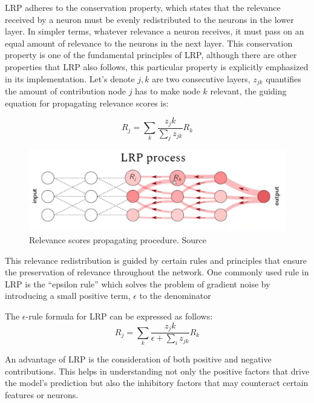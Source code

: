 LRP adheres to the conservation property, which states that the relevance received by a neuron must be evenly redistributed to the neurons in the lower layer. In simpler terms, whatever relevance a neuron receives, it must pass on an equal amount of relevance to the neurons in the next layer. This conservation property is one of the fundamental principles of LRP, although there are other properties that LRP also follows, this particular property is explicitly emphasized in its implementation. Let's denote $j, k$ are two consecutive layers, $z_{jk}$ quantifies the amount of contribution node $j$ has to make node $k$ relevant, the guiding equation for propagating relevance scores is:

\begin{equation}
\label{equation:conservation}
    R_j = \sum_{k}{\frac{z_jk}{\sum_j{z_{jk}}}}R_k
\end{equation}

\begin{figure}[hbt!]
\centering
\includegraphics[width=13cm]{images/xai_methods/lrp.png}
\caption{Relevance scores propagating procedure. Source \cite{lrp}}
\end{figure}

This relevance redistribution is guided by certain rules and principles that ensure the preservation of relevance throughout the network. One commonly used rule in LRP is the ``epsilon rule'' which solves the problem of gradient noise by introducing a small positive term, $\epsilon$ to the denominator

The $\epsilon$-rule formula for LRP can be expressed as follows:
\begin{equation}
    R_j = \sum_{k}{\frac{z_jk}{\epsilon + \sum_i{z_{jk}}}}R_k
\end{equation}

An advantage of LRP is the consideration of both positive and negative contributions. This helps in understanding not only the positive factors that drive the model's prediction but also the inhibitory factors that may counteract certain features or neurons.

